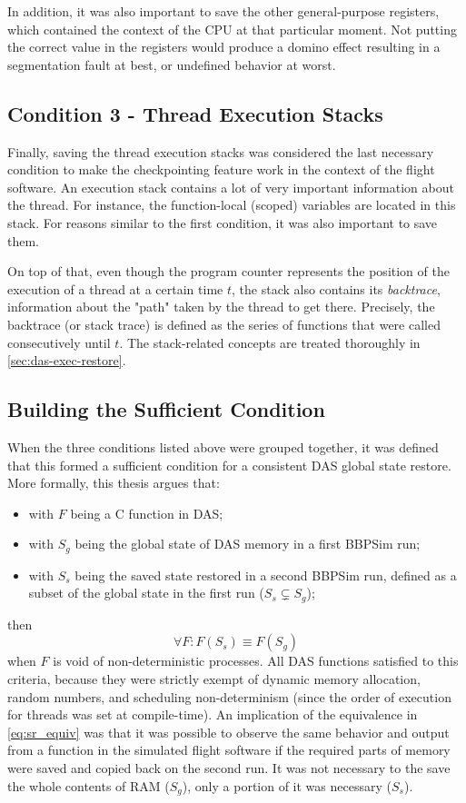 {In addition, it was also important to save the other general-purpose registers, which contained the context of the CPU at that particular moment. Not putting the correct value in the registers would produce a domino effect resulting in a segmentation fault at best, or undefined behavior at worst.

\subsection*{Condition 3 - Thread Execution Stacks}
Finally, saving the thread execution stacks was considered the last necessary condition to make the checkpointing feature work in the context of the flight software. An execution stack contains a lot of very important information about the thread. For instance, the function-local (scoped) variables are located in this stack. For reasons similar to the first condition, it was also important to save them.

On top of that, even though the program counter represents the position of the execution of a thread at a certain time $t$, the stack also contains its \textit{backtrace}, information about the "path" taken by the thread to get there. Precisely, the backtrace (or stack trace) is defined as the series of functions that were called consecutively until $t$. The stack-related concepts are treated thoroughly in \autoref{sec:das-exec-restore}.

\subsection*{Building the Sufficient Condition}
When the three conditions listed above were grouped together, it was defined that this formed a sufficient condition for a consistent DAS global state restore. More formally, this thesis argues that:
\begin{itemize}
	\item with $F$ being a C function in DAS;
	\item with $S_g$ being the global state of DAS memory in a first BBPSim run;
	\item with $S_s$ being the saved state restored in a second BBPSim run, defined as a subset of the global state in the first run ($S_s \subsetneq S_g$);
\end{itemize}
then
\begin{equation} \label{eq:sr_equiv}
	\forall F: F(S_s)\equiv F(S_g)
\end{equation}
when $F$ is void of non-deterministic processes. All DAS functions satisfied to this criteria, because they were strictly exempt of dynamic memory allocation, random numbers, and scheduling non-determinism (since the order of execution for threads was set at compile-time). An implication of the equivalence in \autoref{eq:sr_equiv} was that it was possible to observe the same behavior and output from a function in the simulated flight software if the required parts of memory were saved and copied back on the second run. It was not necessary to the save the whole contents of RAM ($S_g$), only a portion of it was necessary ($S_s$).

}
